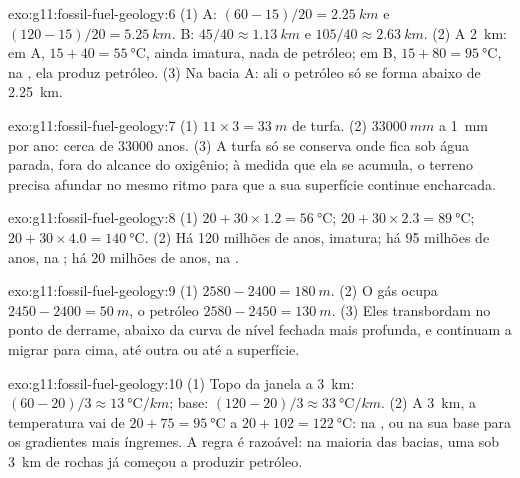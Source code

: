 \begin{solution}{exo:g11:fossil-fuel-geology:6}
(1) A: $(60 - 15)/20 = \qty{2.25}{km}$ e $(120 - 15)/20 = \qty{5.25}{km}$.
B: $45/40 \approx \qty{1.13}{km}$ e $105/40 \approx \qty{2.63}{km}$.
(2) A \qty{2}{km}: em A, $15 + 40 = \qty{55}{\degreeCelsius}$, ainda
imatura, nada de petróleo; em B, $15 + 80 = \qty{95}{\degreeCelsius}$, na
, ela produz petróleo. (3) Na bacia A: ali o petróleo só
se forma abaixo de \qty{2.25}{km}.
\end{solution}

\begin{solution}{exo:g11:fossil-fuel-geology:7}
(1) $11 \times 3 = \qty{33}{m}$ de turfa. (2) $\qty{33000}{mm}$ a
\qty{1}{mm} por ano: cerca de \num{33000} anos. (3) A turfa só se conserva
onde fica sob água parada, fora do alcance do oxigênio; à medida que ela se
acumula, o terreno precisa afundar no mesmo ritmo para que a sua superfície
continue encharcada.
\end{solution}

\begin{solution}{exo:g11:fossil-fuel-geology:8}
(1) $20 + 30 \times 1.2 = \qty{56}{\degreeCelsius}$;
$20 + 30 \times 2.3 = \qty{89}{\degreeCelsius}$;
$20 + 30 \times 4.0 = \qty{140}{\degreeCelsius}$.
(2) Há 120 milhões de anos, imatura; há 95 milhões de anos, na ; há 20 milhões de anos, na .
\end{solution}

\begin{solution}{exo:g11:fossil-fuel-geology:9}
(1) $2580 - 2400 = \qty{180}{m}$. (2) O gás ocupa
$2450 - 2400 = \qty{50}{m}$, o petróleo $2580 - 2450 = \qty{130}{m}$. (3) Eles
transbordam no ponto de derrame, abaixo da curva de nível fechada mais
profunda, e continuam a migrar para cima, até outra  ou até a
superfície.
\end{solution}

\begin{solution}{exo:g11:fossil-fuel-geology:10}
(1) Topo da janela a \qty{3}{km}: $(60 - 20)/3 \approx
\qty{13}{\degreeCelsius/km}$; base: $(120 - 20)/3 \approx
\qty{33}{\degreeCelsius/km}$. (2) A \qty{3}{km}, a temperatura vai de
$20 + 75 = \qty{95}{\degreeCelsius}$ a $20 + 102 = \qty{122}{\degreeCelsius}$:
na , ou na sua base para os gradientes mais íngremes. A
regra é razoável: na maioria das bacias, uma  sob \qty{3}{km}
de rochas já começou a produzir petróleo.
\end{solution}

